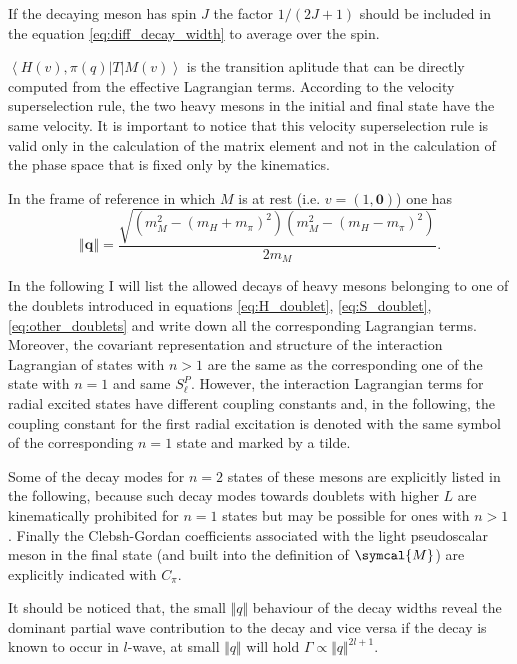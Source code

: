 If the decaying meson has spin $J$ the factor $1/(2 J + 1)$ should be included in the equation \eqref{eq:diff_decay_width} to average over the spin.

$\left\langle H \left( v \right), \pi \left( q \right) \right\vert T \left\vert M \left( v \right) \right\rangle$ is the transition aplitude that can be directly computed from the effective Lagrangian terms. According to the velocity superselection rule, the two heavy mesons in the initial and final state have the same velocity. It is important to notice that this velocity superselection rule is valid only in the calculation of the matrix element and not in the calculation of the phase space that is fixed only by the kinematics.

In the frame of reference in which $M$ is at rest (i.e. $v = (1, \symbf{0})$) one has
\begin{equation}
  \left\Vert \symbf{q} \right\Vert = \frac{\sqrt{\left(m_M^2 - (m_H + m_\pi)^2\right) \left(m_M^2 - (m_H - m_\pi)^2\right)}}{2 m_M} .
\end{equation}

In the following I will list the allowed decays of heavy mesons belonging to one of the doublets introduced in equations \eqref{eq:H_doublet}, \eqref{eq:S_doublet}, \eqref{eq:other_doublets} and write down all the corresponding Lagrangian terms. Moreover, the covariant representation and structure of the interaction Lagrangian of states with $n > 1$ are the same as the corresponding one of the state with $n = 1$ and same $S_\ell^P$. However, the interaction Lagrangian terms for radial excited states have different coupling constants and, in the following, the coupling constant for the first radial excitation is denoted with the same symbol of the corresponding $n = 1$ state and marked by a tilde.

Some of the decay modes for $n = 2$ states of these mesons are explicitly listed in the following, because such decay modes towards doublets with higher $L$ are kinematically prohibited for $n = 1$ states but may be possible for ones with $n > 1$. Finally the Clebsh-Gordan coefficients associated with the light pseudoscalar meson in the final state (and built into the definition of $\symcal{M}$) are explicitly indicated with $C_\pi$.

It should be noticed that, the small $\Vert q \Vert$ behaviour of the decay widths reveal the dominant partial wave contribution to the decay and vice versa if the decay is known to occur in $l$-wave, at small $\Vert q \Vert$ will hold $\Gamma \propto \Vert q \Vert^{2 l+1}$.

